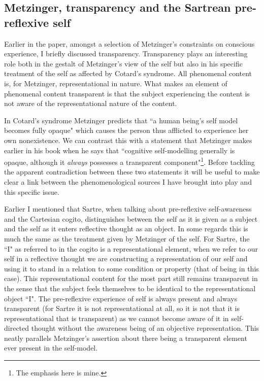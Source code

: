 \subsection{Metzinger, transparency and the Sartrean pre-reflexive self}
\label{metzinger_self_sartre}

Earlier in the paper, amongst a selection of Metzinger's constraints on conscious experience, I briefly discussed transparency. Transparency plays an interesting role both in the gestalt of Metzinger's view of the self but also in his specific treatment of the self as affected by Cotard's syndrome. All phenomenal content is, for Metzinger, representational in nature. What makes an element of phenomenal content transparent is that the subject experiencing the content is not aware of the representational nature of the content. 

In Cotard's syndrome Metzinger predicts that ``a human being's self model becomes fully opaque" \cite[p. 460]{metzinger2003} which causes the person thus afflicted to experience her own nonexistence. We can contrast this with a statement that Metzinger makes earlier in his book when he says that ``cognitive self-modelling generally is opaque, although it \emph{always} possesses a transparent component"\footnote{The emphasis here is mine.}. Before tackling the apparent contradiction between these two statements it will be useful to make clear a link between the phenomenological sources I have brought into play and this specific issue.

Earlier I mentioned that Sartre, when talking about pre-reflexive self-awareness and the Cartesian cogito, distinguishes between the self as it is given as a subject and the self as it enters reflective thought as an object. In some regards this is much the same as the treatment given by Metzinger of the self. For Sartre, the ``I" as referred to in the cogito is a representational element, when we refer to our self in a reflective thought we are constructing a representation of our self and using it to stand in a relation to some condition or property (that of being in this case). This representational content for the most part still remains transparent in the sense that the subject feels themselves to be identical to the representational object ``I". The pre-reflexive experience of self is always present and always transparent (for Sartre it is not representational at all, so it is not that it is representational that is transparent) as we cannot become aware of it in self-directed thought without the awareness being of an objective representation. This neatly parallels Metzinger's assertion about there being a transparent element ever present in the self-model.

